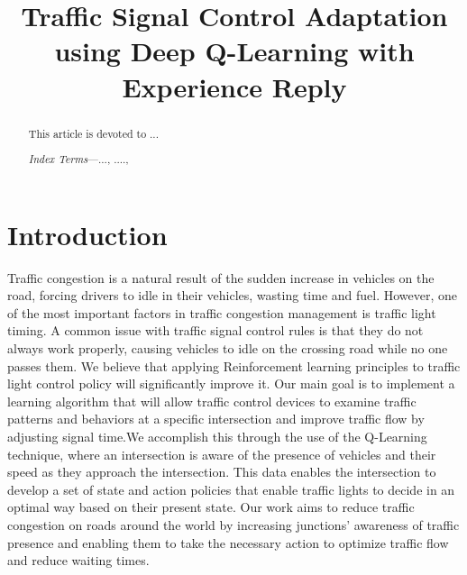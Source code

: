 \documentclass[conference]{IEEEtran}
\begin{document}
\def\refname{\textbf{References}}

\title{Traffic Signal Control Adaptation using Deep Q-Learning with Experience Reply}

\author{
    
 
    \and
    
    
}
\maketitle
\IEEEpeerreviewmaketitle


\begin{abstract}
This article is devoted to ...

\textit{Index Terms}—..., ...., 
\end{abstract}

\section{Introduction}
Traffic congestion is a natural result of the sudden increase in vehicles on the road, forcing drivers to idle in their vehicles, wasting time and fuel. However, one of the most important factors in traffic congestion management is traffic light timing. A common issue with traffic signal control rules is that they do not always work properly, causing vehicles to idle on the crossing road while no one passes them. We believe that applying Reinforcement learning principles to traffic light control policy will significantly improve it. Our main goal is to implement a learning algorithm that will allow traffic control devices to examine traffic patterns and behaviors at a specific intersection and improve traffic flow by adjusting signal time.We accomplish this through the use of the Q-Learning technique, where an intersection is aware of the presence of vehicles and their speed as they approach the intersection. This data enables the intersection to develop a set of state and action policies that enable traffic lights to decide in an optimal way based on their present state. Our work aims to reduce traffic congestion on roads around the world by increasing junctions' awareness of traffic presence and enabling them to take the necessary action to optimize traffic flow and reduce waiting times.
\end{document}
